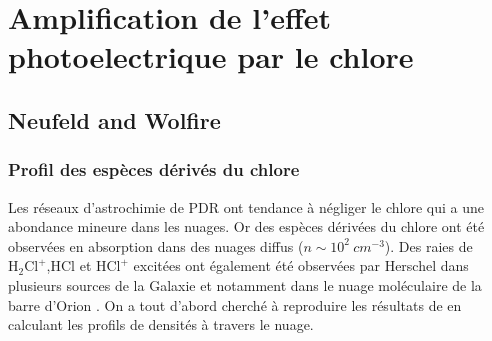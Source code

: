 


\section{Amplification de l'effet photoelectrique par le chlore}

\subsection{Neufeld and Wolfire}
\subsubsection{Profil des espèces dérivés du chlore}

Les réseaux d'astrochimie de PDR ont tendance à négliger le chlore qui a une abondance mineure dans les nuages. Or des espèces dérivées du chlore ont été observées en absorption dans des nuages diffus ($n \sim 10^2\ cm^{-3}$). Des raies de $\mathrm{H}_2\mathrm{Cl}^+$,HCl et $\mathrm{HCl}^+$ excitées ont également été observées par Herschel dans plusieurs sources de la Galaxie et notamment dans le nuage moléculaire de la barre d'Orion \cite{Neufeld2012,Neufire2009}. On a tout d'abord cherché à reproduire les résultats de \cite{Neufeld2009} en calculant les profils de densités à travers le nuage.

